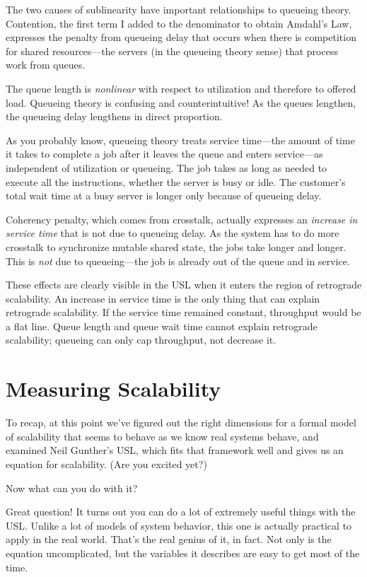 \documentclass{vivid_layout}
\begin{document}
The two causes of sublinearity have important relationships to queueing theory.
Contention, the first term I added to the denominator to obtain Amdahl's Law,
expresses the penalty from queueing delay that occurs when there is competition
for shared resources---the servers (in the queueing theory sense) that process
work from queues.

The queue length is {\itshape nonlinear} with respect to utilization and
therefore to offered load. Queueing theory is confusing and counterintuitive! As
the queues lengthen, the queueing delay lengthens in direct proportion.

As you probably know, queueing theory treats service time---the amount of time
it takes to complete a job after it leaves the queue and enters service---as
independent of utilization or queueing. The job takes as long as needed to
execute all the instructions, whether the server is busy or idle. The customer's
total wait time at a busy server is longer only because of queueing delay.

Coherency penalty, which comes from crosstalk, actually expresses an {\itshape
increase in service time} that is not due to queueing delay. As the system has
to do more crosstalk to synchronize mutable shared state, the jobs take longer
and longer. This is {\itshape not} due to queueing---the job is already out of
the queue and in service.

These effects are clearly visible in the USL when it enters the region of
retrograde scalability. An increase in service time is the only thing that can
explain retrograde scalability. If the service time remained constant,
throughput would be a flat line. Queue length and queue wait time cannot explain
retrograde scalability; queueing can only cap throughput, not decrease it.

\newpage
\section{Measuring Scalability}

To recap, at this point we've figured out the right dimensions for a formal model
of scalability that seems to behave as we know real systems behave, and examined
Neil Gunther's USL, which fits that framework well and gives us an equation for
scalability. (Are you excited yet?)

Now what can you do with it?

Great question! It turns out you can do a lot of extremely useful things with the
USL.  Unlike a lot of models of system behavior, this one is actually practical
to apply in the real world. That's the real genius of it, in fact. Not only is
the equation uncomplicated, but the variables it describes are easy to get most
of the time.
\end{document}
